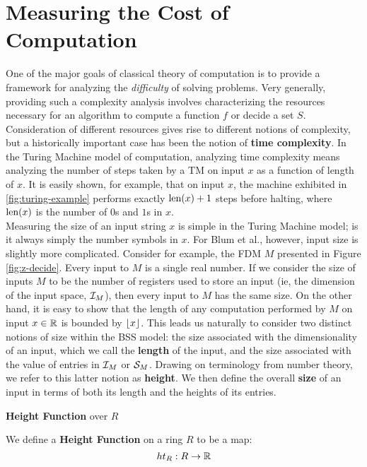 \section{Measuring the Cost of Computation}
\label{sec:measuring}
One of the major goals of classical theory of computation is to
provide a framework for analyzing the \emph{difficulty} of solving
problems.  Very generally, providing such a complexity analysis
involves characterizing the resources necessary for an algorithm to
compute a function $f$ or decide a set $S$.  Consideration of
different resources gives rise to different notions of complexity, but
a historically important case has been the notion of \textbf{time
  complexity}.  In the Turing Machine model of computation, analyzing
time complexity means analyzing the number of steps taken by a TM on
input $x$ as a function of length of $x$.  It is easily shown, for
example, that on input $x$, the machine exhibited in
\ref{fig:turing-example} performs exactly $\text{len}(x) + 1$ steps before
halting, where $\text{len}(x)$ is the number of $0$s and $1$s in $x$.\\

Measuring the size of an input string $x$ is simple in the Turing
Machine model; is it always simply the number symbols in $x$.  For
Blum et al., however, input size is slightly more complicated.
Consider for example, the FDM $M$ presented in Figure
\ref{fig:z-decide}.  Every input to $M$ is a single real number.  If
we consider the size of inputs $M$ to be the number of registers used
to store an input (ie, the dimension of the input space,
$\mathcal{I}_M$), then every input to $M$ has the same size.  On the
other hand, it is easy to show that the length of any computation
performed by $M$ on input $x \in \mathbb{R}$ is bounded by $\lfloor x \rfloor$.
This leads us naturally to consider two distinct notions of size
within the BSS model: the size associated with the dimensionality of
an input, which we call the \textbf{length} of the input, and the size
associated with the value of entries in $\mathcal{I}_M$ or
$\mathcal{S}_M$.  Drawing on terminology from number theory, we refer
to this latter notion as \textbf{height}.  We then define the overall
\textbf{size} of an input in terms of both its length and the heights
of its entries.

\begin{definition}{\textbf{Height Function} over $R$}

  We define a \textbf{Height Function} on a ring $R$ to be a map:
  $$ht_R:R \rightarrow \mathbb{R}$$
\end{definition}


